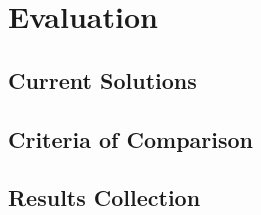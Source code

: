 \chapter{Evaluation}

\section{Current Solutions}

\section{Criteria of Comparison}

\section{Results Collection}
